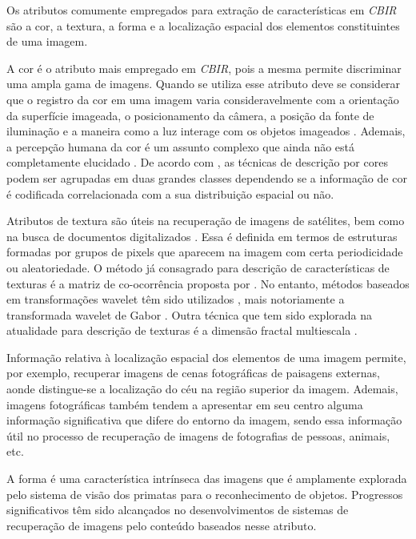 Os atributos comumente empregados para extração de características em \emph{CBIR} são a cor, a textura, a forma e a localização espacial dos elementos constituintes de uma imagem. 

A cor é o atributo mais empregado em \emph{CBIR}, pois a mesma permite discriminar uma ampla gama de imagens. Quando se utiliza esse atributo deve se considerar que o registro da cor em uma imagem varia consideravelmente com a orientação da superfície imageada, o posicionamento da câmera, a posição da fonte de iluminação e a maneira como a luz interage com os objetos imageados \cite{Smeulders:2000}. Ademais, a percepção humana da cor é um assunto complexo que ainda não está completamente elucidado \cite{Smeulders:2000}. De acordo com , as técnicas de descrição por cores podem ser agrupadas em duas grandes classes dependendo se a informação de cor é codificada correlacionada com a sua distribuição espacial ou não. 

\begin{comment}Esses mesmos autores exemplificam como técnicas que não levam em consideração a distribuição espacial das cores os histogramas e os momentos de cores. 
\end{comment}

Atributos de textura são úteis na recuperação de imagens de satélites, bem como na busca de documentos digitalizados \cite{Smeulders:2000}. Essa é definida em termos de estruturas formadas por grupos de pixels que aparecem na imagem com certa periodicidade ou aleatoriedade. O método já consagrado para descrição de características de texturas é a matriz de co-ocorrência proposta por . No entanto, métodos baseados em transformações wavelet têm sido utilizados \cite{5376587}, mais notoriamente a transformada wavelet de Gabor \cite{531803}. Outra técnica que tem sido explorada na atualidade para descrição de texturas é a dimensão fractal multiescala \cite{Florindo:2013}. 

Informação relativa à localização espacial dos elementos de uma imagem permite, por exemplo, recuperar imagens de cenas fotográficas de paisagens externas, aonde distingue-se a localização do céu na região superior da imagem. Ademais, imagens fotográficas também tendem a apresentar em seu centro alguma informação significativa que difere do entorno da imagem, sendo essa informação útil no processo de recuperação de imagens de fotografias de pessoas, animais, etc.

A forma é uma característica intrínseca das imagens que é amplamente explorada pelo sistema de visão dos primatas para o reconhecimento de objetos. Progressos significativos têm sido alcançados no desenvolvimentos de sistemas de recuperação de imagens pelo conteúdo baseados nesse atributo.

